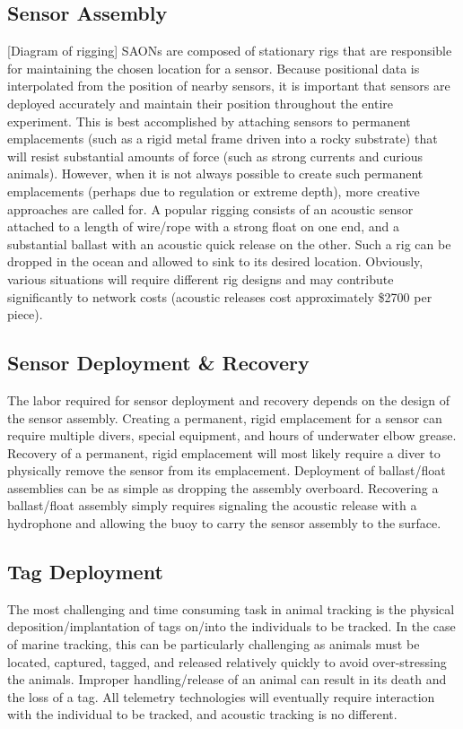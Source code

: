 \subsection{Sensor Assembly}
[Diagram of rigging]
SAONs are composed of stationary rigs that are responsible for maintaining the chosen location for a sensor.  Because positional data is interpolated from the position of nearby sensors, it is important that sensors are deployed accurately and maintain their position throughout the entire experiment\cite{Heupel2006}.  This is best accomplished by attaching sensors to permanent emplacements  (such as a rigid metal frame driven into a rocky substrate) that will resist substantial amounts of force (such as strong currents and curious animals).  However, when it is not always possible to create such permanent emplacements (perhaps due to regulation or extreme depth), more creative approaches are called for.  A popular rigging consists of an acoustic sensor attached to a length of wire/rope with a strong float on one end, and a substantial ballast with an acoustic quick release on the other\cite{Heupel2006}.  Such a rig can be dropped in the ocean and allowed to sink to its desired location.  Obviously, various situations will require different rig designs and may contribute significantly to network costs (acoustic releases cost approximately \$2700 per piece).

\subsection{Sensor Deployment \& Recovery}
The labor required for sensor deployment and recovery depends on the design of the sensor assembly.  Creating a permanent, rigid emplacement for a sensor can require multiple divers, special equipment,  and hours of underwater elbow grease.  Recovery of a permanent, rigid emplacement will most likely require a diver to physically remove the sensor from its emplacement. Deployment of ballast/float assemblies can be as simple as dropping the assembly overboard.  Recovering a ballast/float assembly simply requires signaling the acoustic release with a hydrophone and allowing the buoy to carry the sensor assembly to the surface.

\subsection{Tag Deployment}
The most challenging and time consuming task in animal tracking is the physical deposition/implantation of tags on/into the individuals to be tracked.  In the case of marine tracking, this can be particularly challenging as animals must be located, captured, tagged, and released relatively quickly to avoid over-stressing the animals.  Improper handling/release of an animal can result in its death and the loss of a tag.  All telemetry technologies will eventually require interaction with the individual to be tracked, and acoustic tracking is no different.

